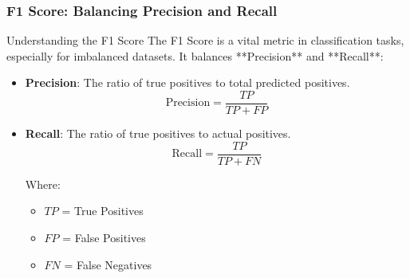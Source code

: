 \documentclass[aspectratio=169]{beamer}
\begin{document}
\begin{frame}[fragile]
  \frametitle{F1 Score: Balancing Precision and Recall}

  \begin{block}{Understanding the F1 Score}
    The F1 Score is a vital metric in classification tasks, especially for imbalanced datasets. It balances **Precision** and **Recall**:
  \end{block}

  \begin{itemize}
    \item \textbf{Precision}: The ratio of true positives to total predicted positives.
    \begin{equation}
      \text{Precision} = \frac{TP}{TP + FP}
    \end{equation}

    \item \textbf{Recall}: The ratio of true positives to actual positives.
    \begin{equation}
      \text{Recall} = \frac{TP}{TP + FN}
    \end{equation}

    Where:
    \begin{itemize}
      \item \( TP \) = True Positives
      \item \( FP \) = False Positives
      \item \( FN \) = False Negatives
    \end{itemize}
  \end{itemize}
\end{frame}
\end{document}
